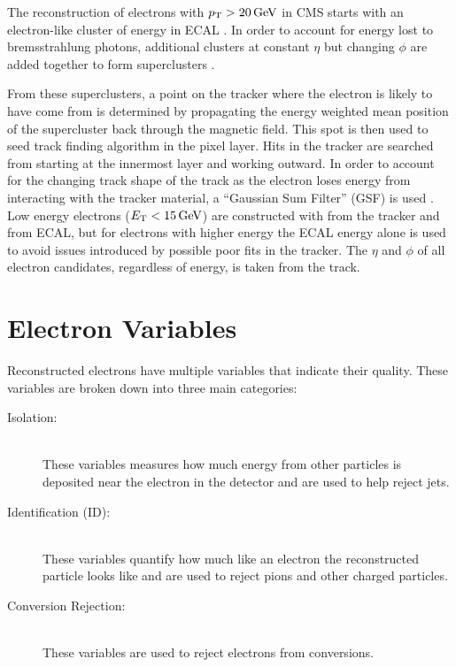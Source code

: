 The reconstruction of electrons with $p_{\mathrm{T}} > 20 \,\text{Ge\hspace{-.08em}V}$ in CMS starts with an
electron-like cluster of energy in ECAL \cite{eg_reco_2010}. In order to
account for energy lost to bremsstrahlung photons, additional clusters at
constant $\eta$ but changing $\phi$ are added together to form superclusters
\cite{baffioni_2007}.

From these superclusters, a point on the tracker where the electron is likely
to have come from is determined by propagating the energy weighted mean
position of the supercluster back through the magnetic field. This spot is then
used to seed  track finding algorithm in the pixel layer. Hits in the tracker
are searched from starting at the innermost layer and working outward. In order
to account for the changing track shape of the track as the electron loses
energy from interacting with the tracker material, a ``Gaussian Sum Filter''
(GSF) is used \cite{adam_2005}. Low energy electrons ($E_{\mathrm{T}} < 15 \,\text{Ge\hspace{-.08em}V}$) are
constructed with \pt from the tracker and \ET from ECAL, but for electrons with
higher energy the ECAL energy alone is used to avoid issues introduced by
possible poor fits in the tracker. The $\eta$ and $\phi$ of all electron
candidates, regardless of energy, is taken from the track.

\section{Electron Variables}

Reconstructed electrons have multiple variables that indicate their quality.
These variables are broken down into three main categories:

\begin{description}
    \item[Isolation:] \hfill \\
        These variables measures how much energy from other particles is
        deposited near the electron in the detector and are used to help reject
        jets.
    \item[Identification (ID):] \hfill \\
        These variables quantify how much like an electron the reconstructed
        particle looks like and are used to reject pions and other charged
        particles.
    \item[Conversion Rejection:] \hfill \\
        These variables are used to reject electrons from \photontoee
        conversions.
\end{description}

